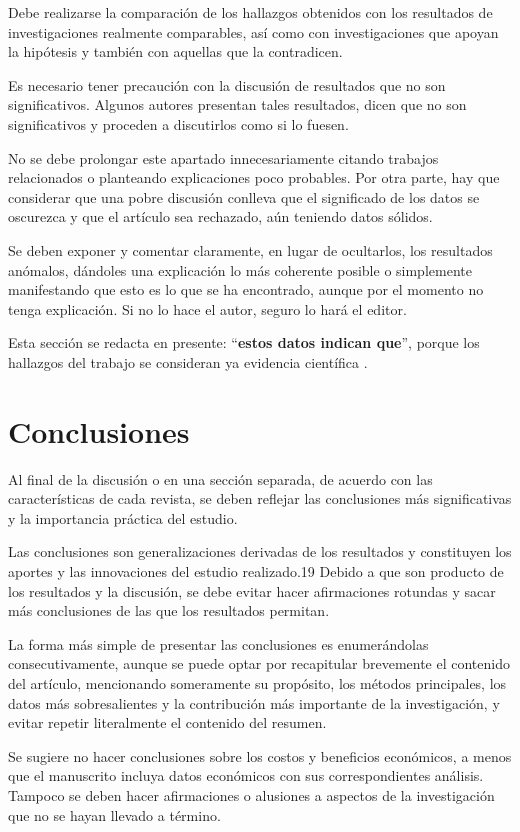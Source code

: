\documentclass[%
 reprint,
groupedaddress,
unsortedaddress,
 amsmath,amssymb,
 aps,
superscriptaddress
]{revtex4-2}
\begin{document}
Debe realizarse la comparación de los hallazgos obtenidos con los resultados de 
investigaciones realmente comparables, así como con investigaciones que apoyan la 
hipótesis y también con aquellas que la contradicen.

Es necesario tener precaución con la discusión de resultados que no son significativos. 
Algunos autores presentan tales resultados, dicen que no son significativos y proceden a 
discutirlos como si lo fuesen.

No se debe prolongar este apartado innecesariamente citando trabajos relacionados o 
planteando explicaciones poco probables. Por otra parte, hay que considerar que una pobre 
discusión conlleva que el significado de los datos se oscurezca y que el artículo sea 
rechazado, aún teniendo datos sólidos.

Se deben exponer y comentar claramente, en lugar de ocultarlos, los resultados anómalos, 
dándoles una explicación lo más coherente posible o simplemente manifestando que esto es 
lo que se ha encontrado, aunque por el momento no tenga explicación. Si no lo hace el 
autor, seguro lo hará el editor.

Esta sección se redacta en presente: ``\textbf{estos datos indican que}'', porque los 
hallazgos del trabajo se consideran ya evidencia científica . 

\section{Conclusiones}
\label{Sec:Concl}
Al final de la discusión o en una sección separada, de acuerdo con las características de 
cada revista, se deben reflejar las conclusiones más significativas y la importancia 
práctica del estudio.

Las conclusiones son generalizaciones derivadas de los resultados y constituyen los 
aportes y las innovaciones del estudio realizado.19 Debido a que son producto de los 
resultados y la discusión, se debe evitar hacer afirmaciones rotundas y sacar más 
conclusiones de las que los resultados permitan.

La forma más simple de presentar las conclusiones es enumerándolas consecutivamente, 
aunque se puede optar por recapitular brevemente el contenido del artículo, mencionando 
someramente su propósito, los métodos principales, los datos más sobresalientes y la 
contribución más importante de la investigación, y evitar repetir literalmente el 
contenido del resumen.

Se sugiere no hacer conclusiones sobre los costos y beneficios económicos, a menos que el 
manuscrito incluya datos económicos con sus correspondientes análisis. Tampoco se deben 
hacer afirmaciones o alusiones a aspectos de la investigación que no se hayan llevado a 
término. 
\end{document}
